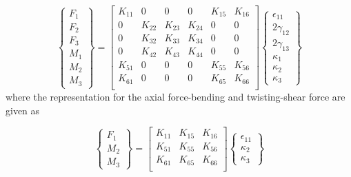 \documentclass[letterpaper,12pt]{article}
\begin{document}
\begin{equation}
\label{eq:curve}
\begin{Bmatrix}
F_1 \\  F_2 \\ F_3 \\ M_1 \\ M_2 \\ M_3
\end{Bmatrix}
 = 
\begin{bmatrix}
K_{11} & 0 & 0 & 0 & K_{15} & K_{16} \\
0 & K_{22} & K_{23} & K_{24} & 0 & 0 \\
0 & K_{32} & K_{33} & K_{34} & 0 & 0 \\
0 & K_{42} & K_{43} & K_{44} & 0 & 0 \\
K_{51} & 0 & 0 & 0 & K_{55} & K_{56} \\
K_{61} & 0 & 0 & 0 & K_{65} & K_{66} \\
\end{bmatrix} \begin{Bmatrix}
\epsilon_{11} \\  2\gamma_{12} \\ 2\gamma_{13} \\ \kappa_1 \\ \kappa_2 \\ \kappa_3
\end{Bmatrix}
\end{equation}
where the representation for the axial force-bending and twisting-shear force are given as

\begin{equation}
\begin{Bmatrix}
F_1 \\ M_2 \\ M_3
\end{Bmatrix}
 = 
\begin{bmatrix}
K_{11}  & K_{15} & K_{16} \\
K_{51} & K_{55} & K_{56} \\
K_{61} & K_{65} & K_{66} \\
\end{bmatrix} \begin{Bmatrix}
\epsilon_{11} \\ \kappa_2 \\ \kappa_3
\end{Bmatrix}
\end{equation}
\end{document}

